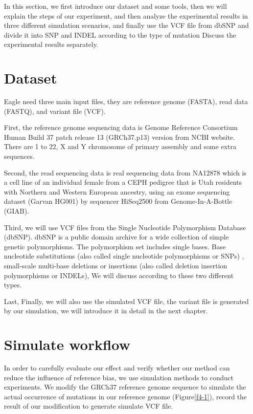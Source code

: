 \hspace{24pt}
In this section, we first introduce our dataset and some tools, then we will explain the steps of our experiment, and then analyze the experimental results in three different simulation scenarios, and finally use the VCF file from dbSNP and divide it into SNP and INDEL according to the type of mutation Discuss the experimental results separately.

\section{Dataset}
Eagle need three main input files, they are reference genome (FASTA), read data (FASTQ), and variant file (VCF). 

First, the reference genome sequencing data is Genome Reference Consortium Human Build 37 patch release 13 (GRCh37.p13) version from NCBI website. There are 1 to 22, X and Y chromosome of primary assembly and some extra sequences.

Second, the read sequencing data is real sequencing data from NA12878 which is a cell line of an individual female from a CEPH pedigree that is Utah residents with Northern and Western European ancestry, using an exome sequencing dataset (Garvan HG001) by sequencer HiSeq2500 from Genome-In-A-Bottle (GIAB).

Third, we will use VCF files from the Single Nucleotide Polymorphism Database (dbSNP). dbSNP is a public domain archive for a wide collection of simple genetic polymorphisms. The polymorphism set includes single bases. Base nucleotide substitutions (also called single nucleotide polymorphisms or SNPs) , small-scale multi-base deletions or insertions (also called deletion insertion polymorphisms or INDELs), We will discuss according to these two different types.

Last, Finally, we will also use the simulated VCF file, the variant file is generated by our simulation, we will introduce it in detail in the next chapter.

\section{Simulate workflow}
In order to carefully evaluate our effect and verify whether our method can reduce the influence of reference bias, we use simulation methods to conduct experiments. We modify the GRCh37 reference genome sequence to simulate the actual occurrence of mutations in our reference genome (Figure\ref{f4-1}), record the result of our modification to generate simulate VCF file.

